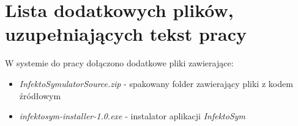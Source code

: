 \chapter{Lista dodatkowych plików, uzupełniających tekst pracy} 


W systemie do pracy dołączono dodatkowe pliki zawierające:
\begin{itemize}
\item \textit{InfektoSymulatorSource.zip} - spakowany folder zawierający pliki z kodem źródłowym
\item \textit{infektosym-installer-1.0.exe} - instalator aplikacji \textit{InfektoSym}
\end{itemize}
